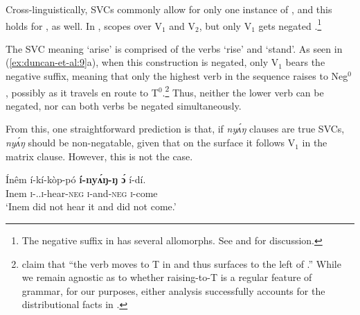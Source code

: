 \documentclass[output=paper,modfonts,nonflat,
hidelinks
]{langsci/langscibook}
\begin{document}
Cross-linguistically, SVCs commonly allow for only one instance of  \citep{hiraiwa2008object}, and this holds for , as well. In ,  scopes over V$_1$ and V$_2$, but only V$_1$ gets negated \citep{major2015serial}.\footnote{The negative suffix in  has several allomorphs. See \citet[124-127]{akinlabi2003} and \citet[89]{duncan2016parallel} for discussion.}

\ea\label{ex:duncan-et-al:9}
\z
\z

\noindent The SVC meaning `arise' is comprised of the verbs `rise' and `stand'. As seen in (\ref{ex:duncan-et-al:9}a), when this construction is negated, only V$_1$ bears the negative suffix, meaning that only the highest verb in the sequence raises to Neg$^0$ \citep{duncan-toappear}, possibly as it travels en route to T$^0$.\footnote{\citet[120]{baker2010agreement} claim that ``the verb moves to T in  and thus surfaces to the left of .'' While we remain agnostic as to whether raising-to-T is a regular feature of  grammar, for our purposes, either analysis successfully accounts for the distributional facts in .} Thus, neither the lower verb can be negated, nor can both verbs be negated simultaneously. 

From this, one straightforward prediction is that, if \textit{ny\'{ʌ}ŋ} clauses are true SVCs, \textit{ny\'{ʌ}ŋ} should be non-negatable, given that on the surface it follows V$_1$ in the matrix clause. However, this is not the case.

\ea\label{ex:duncan-et-al:10}
\gll \'{I}nêm í-kí-k\`{o}p-pó \textbf{í-ny\'{ʌ}ŋ-ŋ \'ɔ} í-dí. \\
Inem \textsc{i}-{\PST.\FOC}.\textsc{i}-hear-\textsc{neg} \textsc{i}-and-\textsc{neg} \textsc{i}-come \\
\glt ‘Inem did not hear it and did not come.’ \citep[86]{essien1985negation}
\z
\end{document}
